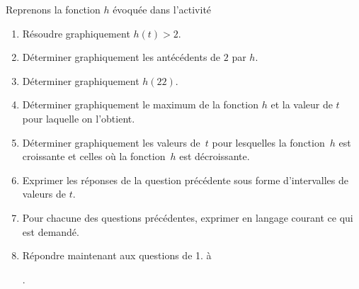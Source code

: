 \exercice Reprenons la fonction $h$ évoquée dans l'activité


\begin{enumerate}
	\item Résoudre graphiquement $h(t) > 2$.
	\item Déterminer graphiquement les antécédents de $2$ par $h$.
	\item Déterminer graphiquement $h(22)$.
	\item Déterminer graphiquement le maximum de la fonction $h$ et la valeur de $t$ pour laquelle on l'obtient.
	\item Déterminer graphiquement les valeurs de~$t$ pour lesquelles la fonction~$h$ est croissante et celles où la fonction~$h$ est décroissante.
	\item Exprimer les réponses de la question précédente sous forme d'intervalles de valeurs de $t$.
	\item Pour chacune des questions précédentes, exprimer en langage courant ce qui est demandé.
	\item Répondre maintenant aux questions de 1. à \addtocounter{enumi}{-2}\theenumi \addtocounter{enumi}{2}.
\end{enumerate}
